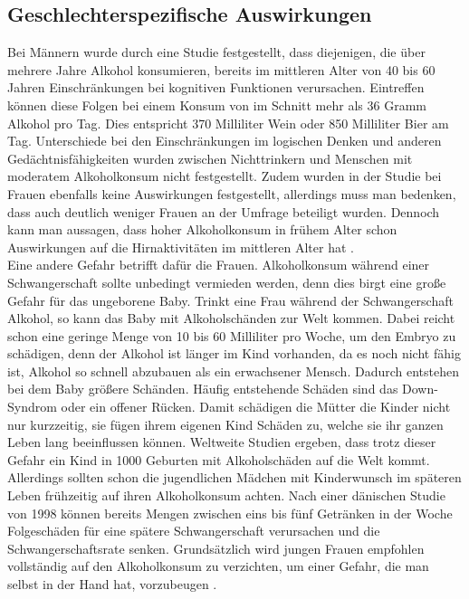 \documentclass[12pt]{article}
\begin{document}
\subsection{Geschlechterspezifische Auswirkungen}
Bei Männern wurde durch eine Studie festgestellt, dass diejenigen, die über mehrere Jahre Alkohol konsumieren, bereits im mittleren Alter von 40 bis 60 Jahren Einschränkungen bei kognitiven Funktionen verursachen. Eintreffen können diese Folgen bei einem Konsum von im Schnitt mehr als 36 Gramm Alkohol pro Tag. Dies entspricht 370 Milliliter Wein oder 850 Milliliter Bier am Tag. Unterschiede bei den Einschränkungen im logischen Denken und anderen Gedächtnisfähigkeiten wurden zwischen Nichttrinkern und Menschen mit moderatem Alkoholkonsum  nicht festgestellt. Zudem wurden in der Studie bei Frauen ebenfalls keine Auswirkungen festgestellt, allerdings muss man bedenken, dass auch deutlich weniger Frauen an der Umfrage beteiligt wurden. Dennoch kann man aussagen, dass hoher Alkoholkonsum in frühem Alter schon Auswirkungen auf die Hirnaktivitäten im mittleren Alter hat \autocite{noauthor_alkohol_2014}. \\
Eine andere Gefahr betrifft dafür die Frauen. Alkoholkonsum während einer Schwangerschaft sollte unbedingt vermieden werden, denn dies birgt eine große Gefahr für das ungeborene Baby. Trinkt eine Frau während der Schwangerschaft Alkohol, so kann das Baby mit Alkoholschänden zur Welt kommen. Dabei reicht schon eine geringe Menge von 10 bis 60 Milliliter pro Woche, um den Embryo zu schädigen, denn der Alkohol ist länger im Kind vorhanden, da es noch nicht fähig ist, Alkohol so schnell abzubauen als ein erwachsener Mensch. Dadurch entstehen bei dem Baby größere Schänden. Häufig entstehende Schäden sind das Down-Syndrom oder ein offener Rücken. Damit schädigen die Mütter die Kinder nicht nur kurzzeitig, sie fügen ihrem eigenen Kind Schäden zu, welche sie ihr ganzen Leben lang beeinflussen können. Weltweite Studien ergeben, dass trotz dieser Gefahr ein Kind in 1000 Geburten mit Alkoholschäden auf die Welt kommt. Allerdings sollten schon die jugendlichen Mädchen mit Kinderwunsch im späteren Leben frühzeitig auf ihren Alkoholkonsum achten. Nach einer dänischen Studie von 1998 können bereits Mengen zwischen eins bis fünf Getränken in der Woche Folgeschäden für eine spätere Schwangerschaft verursachen und die Schwangerschaftsrate senken. Grundsätzlich wird jungen Frauen empfohlen vollständig auf den Alkoholkonsum zu verzichten, um einer Gefahr, die man selbst in der Hand hat, vorzubeugen \autocite[7-8]{butzer_alkohol_nodate}.\\ %
\end{document}
